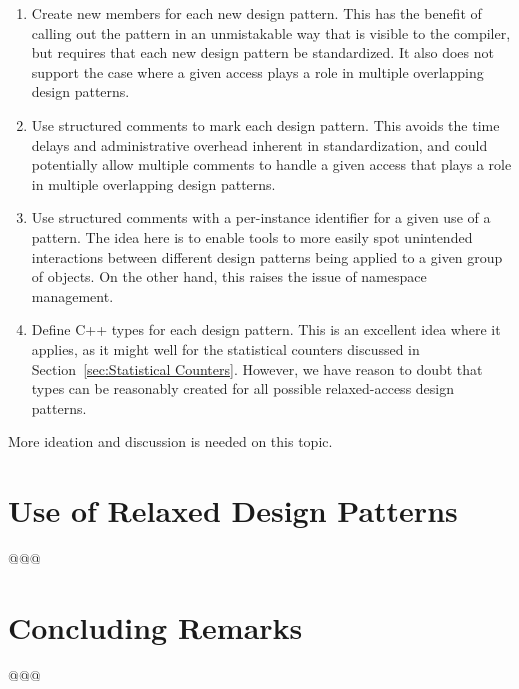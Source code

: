 \documentclass[10]{article}
\begin{document}
\begin{enumerate}
\item	Create new   members for each new
	design pattern.
	This has the benefit of calling out the pattern in an unmistakable
	way that is visible to the compiler, but requires that each
	new design pattern be standardized.
	It also does not support the case where a given access plays a
	role in multiple overlapping design patterns.
\item	Use structured comments to mark each design pattern.
	This avoids the time delays and administrative overhead inherent
	in standardization, and could potentially allow multiple comments
	to handle a given access that plays a role in multiple overlapping
	design patterns.
\item	Use structured comments with a per-instance identifier for
	a given use of a pattern.
	The idea here is to enable tools to more easily spot
	unintended interactions between different design patterns
	being applied to a given group of objects.
	On the other hand, this raises the issue of namespace management.
\item	Define C++  types for each design pattern.
	This is an excellent idea where it applies, as it might well
	for the statistical counters discussed in
	Section~\ref{sec:Statistical Counters}.
	However, we have reason to doubt that  types can
	be reasonably created for all possible relaxed-access design
	patterns.
\end{enumerate}

More ideation and discussion is needed on this topic.

\section{Use of Relaxed Design Patterns}
\label{sec:Use of Relaxed Design Patterns}

@@@

\section{Concluding Remarks}
\label{sec:Concluding Remarks}

@@@




\end{document}
